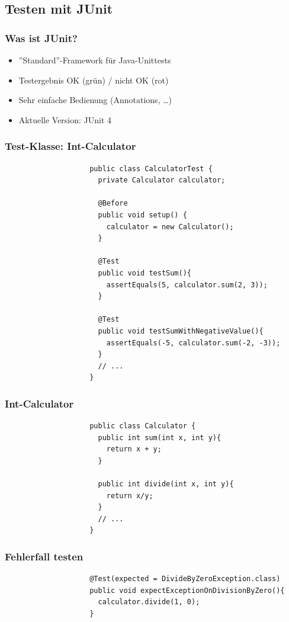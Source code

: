 \documentclass{beamer}
\begin{document}
		\subsection{Testen mit JUnit}

			\begin{frame}
				\frametitle{Was ist JUnit?}

				\begin{itemize}
					\item{''Standard''-Framework für Java-Unittests}
					\item{Testergebnis OK (grün) / nicht OK (rot)}
					\item{Sehr einfache Bedienung (Annotations, \ldots)}
					\item{Aktuelle Version: JUnit 4}
				\end{itemize}
			\end{frame}

			\begin{frame}[fragile]
				\frametitle{Test-Klasse: Int-Calculator}

				\begin{lstlisting}
					public class CalculatorTest {
					  private Calculator calculator;

					  @Before
					  public void setup() {
					    calculator = new Calculator();
					  }

					  @Test
					  public void testSum(){
					    assertEquals(5, calculator.sum(2, 3));
					  }

					  @Test
					  public void testSumWithNegativeValue(){
					    assertEquals(-5, calculator.sum(-2, -3));
					  }
					  // ...
					}
				\end{lstlisting}
			\end{frame}
		
			\begin{frame}[fragile]
				\frametitle{Int-Calculator}

				\begin{lstlisting}
					public class Calculator {
					  public int sum(int x, int y){
					    return x + y;
					  }

					  public int divide(int x, int y){
					    return x/y;
					  }
					  // ...
					}
				\end{lstlisting}
			\end{frame}

			\begin{frame}[fragile]
				\frametitle{Fehlerfall testen}

				\begin{lstlisting}
					@Test(expected = DivideByZeroException.class)
					public void expectExceptionOnDivisionByZero(){
					  calculator.divide(1, 0);
					}
				\end{lstlisting}
			\end{frame}
\end{document}
